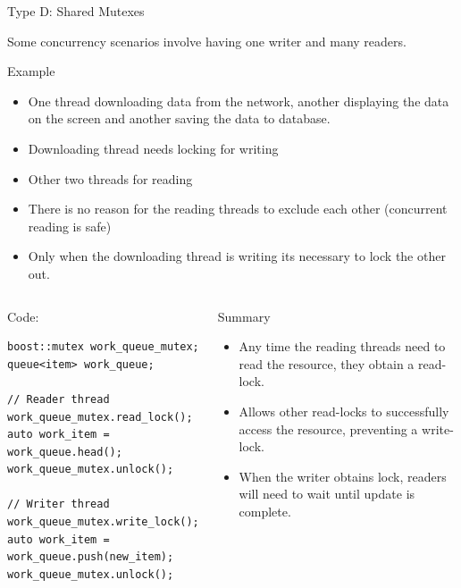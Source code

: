 \documentclass[8pt]{beamer}
\begin{document}
\begin{frame}[fragile]{Type D: Shared Mutexes}
\footnotesize

Some concurrency scenarios involve having one writer and many readers. 
\begin{block}{Example}
\footnotesize

\begin{itemize}
 \item One thread downloading data from the network, another displaying the data on the screen and another saving the data to database.
 \item Downloading thread needs locking for writing
 \item Other two threads for reading
 \item There is no reason for the reading threads to exclude each other (concurrent reading is safe)
 \item Only when the downloading thread is writing its necessary to lock the other out.
\end{itemize}

\end{block}

\begin{columns}

\begin{exampleblock}{Code:}
 
\begin{lstlisting}
boost::mutex work_queue_mutex;
queue<item> work_queue;

// Reader thread
work_queue_mutex.read_lock();
auto work_item = work_queue.head();
work_queue_mutex.unlock();

// Writer thread
work_queue_mutex.write_lock();
auto work_item = work_queue.push(new_item);
work_queue_mutex.unlock();
\end{lstlisting}

\end{exampleblock}

\begin{block}{Summary}
\footnotesize

\begin{itemize}
  \item Any time the reading threads need to read the resource, they obtain a read-lock.
  \item Allows other read-locks to successfully access the resource, preventing a write-lock.
  \item When the writer obtains lock, readers will need to wait until update is complete.  
\end{itemize}

\end{block}

\end{columns}
 
\end{frame}
\end{document}
